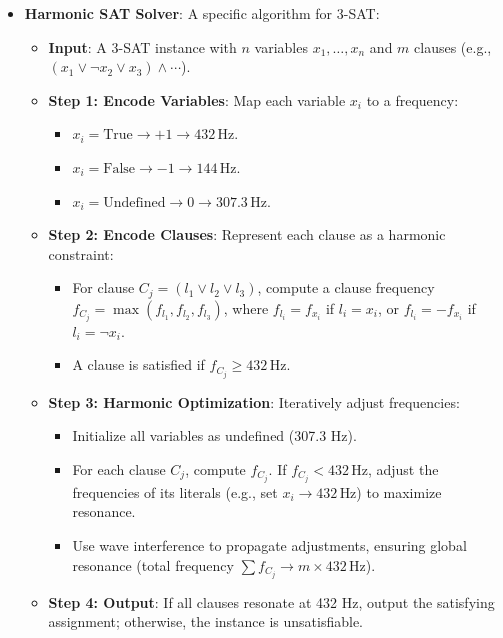 \begin{itemize}
    \item \texttt{} \textbf{Harmonic SAT Solver}: A specific algorithm for 3-SAT:
    \begin{itemize}
        \item \textbf{Input}: A 3-SAT instance with \(n\) variables \(x_1, \ldots, x_n\) and \(m\) clauses (e.g., \((x_1 \lor \neg x_2 \lor x_3) \land \cdots\)).
        \item \textbf{Step 1: Encode Variables}: Map each variable \(x_i\) to a frequency:
        \begin{itemize}
            \item \(x_i = \text{True} \rightarrow +1 \rightarrow 432 \, \text{Hz}\).
            \item \(x_i = \text{False} \rightarrow -1 \rightarrow 144 \, \text{Hz}\).
            \item \(x_i = \text{Undefined} \rightarrow 0 \rightarrow 307.3 \, \text{Hz}\).
        \end{itemize}
        \item \textbf{Step 2: Encode Clauses}: Represent each clause as a harmonic constraint:
        \begin{itemize}
            \item For clause \(C_j = (l_1 \lor l_2 \lor l_3)\), compute a clause frequency \(f_{C_j} = \max(f_{l_1}, f_{l_2}, f_{l_3})\), where \(f_{l_i} = f_{x_i}\) if \(l_i = x_i\), or \(f_{l_i} = -f_{x_i}\) if \(l_i = \neg x_i\).
            \item A clause is satisfied if \(f_{C_j} \geq 432 \, \text{Hz}\).
        \end{itemize}
        \item \textbf{Step 3: Harmonic Optimization}: Iteratively adjust frequencies:
        \begin{itemize}
            \item Initialize all variables as undefined (307.3 Hz).
            \item For each clause \(C_j\), compute \(f_{C_j}\). If \(f_{C_j} < 432 \, \text{Hz}\), adjust the frequencies of its literals (e.g., set \(x_i \rightarrow 432 \, \text{Hz}\)) to maximize resonance.
            \item Use wave interference to propagate adjustments, ensuring global resonance (total frequency \(\sum f_{C_j} \rightarrow m \times 432 \, \text{Hz}\)).
        \end{itemize}
        \item \textbf{Step 4: Output}: If all clauses resonate at 432 Hz, output the satisfying assignment; otherwise, the instance is unsatisfiable.

\end{itemize}
\end{itemize}
